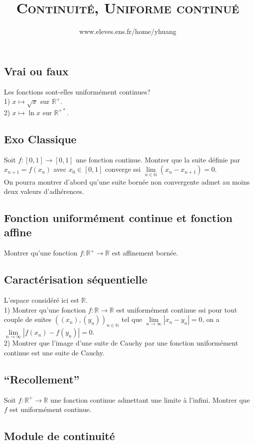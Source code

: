 \documentclass{article}
\begin{document}
\setcounter{section}{16}

\title{\textsc{Continuit\'e, Uniforme continu\'e}}
\author{www.eleves.ens.fr/home/yhuang}
\date{}
\maketitle

\subsection{Vrai ou faux}
Les fonctions sont-elles uniform\'ement continues?\\
1) $x\mapsto\sqrt{x}$ sur $\mathbb{R}^+$.\\
2) $x\mapsto\ln x$ sur $\mathbb{R}^{+*}$.

\subsection{Exo Classique}
Soit $f:[0,1]\to[0,1]$ une fonction continue. Montrer que la suite d\'efinie par $x_{n+1}=f(x_n)$ avec $x_0\in[0,1]$ converge ssi $\lim\limits_{n\in\mathbb{N}}(x_n-x_{n+1})=0$.\\
On pourra montrer d'abord qu'une suite born\'ee non convergente admet au moins deux valeurs d'adh\'erences.

\subsection{Fonction uniform\'ement continue et fonction affine}
Montrer qu'une fonction $f:\mathbb{R}^+\to\mathbb{R}$ est affinement born\'ee.

\subsection{Caract\'erisation s\'equentielle}
L'espace consid\'er\'e ici est $\mathbb{R}$.\\
1) Montrer qu'une fonction $f:\mathbb{R}\to\mathbb{R}$ est uniform\'ement continue ssi pour tout couple de suites $((x_n),(y_n))_{n\in\mathbb{N}}$ tel que $\lim\limits_{n\to\infty}|x_n-y_n|=0$, on a $\lim\limits_{n\to\infty}|f(x_n)-f(y_n)|=0$.\\
2) Montrer que l'image d'une suite de Cauchy par une fonction uniform\'ement continue est une suite de Cauchy.

\subsection{``Recollement''}
Soit $f:\mathbb{R}^+\to\mathbb{R}$ une fonction continue admettant une limite \`a l'infini. Montrer que $f$ est uniform\'ement continue.

\subsection{Module de continuit\'e}
\end{document}

